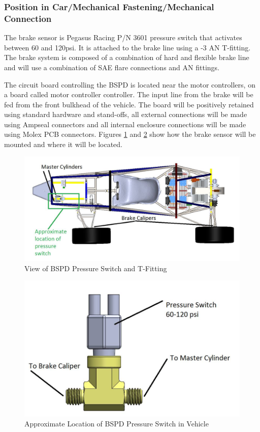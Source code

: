 \documentclass{article}
\begin{document}
        \subsubsection{Position in Car/Mechanical Fastening/Mechanical Connection}
 The brake sensor is Pegasus Racing P/N 3601 pressure switch that activates between 60 and 120psi. It is attached to the brake line using a -3 AN T-fitting. The brake system is composed of a combination of hard and flexible brake line and will use a combination of SAE flare connections and AN fittings.

            The circuit board controlling the BSPD is located near the motor controllers, on a board called motor controller controller. The input line from the brake will be fed from the front bulkhead of the vehicle. The board will be positively retained using standard hardware and stand-offs, all external connections will be made using Ampseal connectors and all internal enclosure connections will be made using Molex PCB connectors. Figures \ref{BSPDmech1} and \ref{BSPDmech2} show how the brake sensor will be mounted and where it will be located.

            \begin{figure}[H]
                \centering
                \includegraphics[width = 0.8 \textwidth]{brakeincar}
                \caption{View of BSPD Pressure Switch and T-Fitting}
                \label{BSPDmech1}
            \end{figure}

            \begin{figure}[H]
                \centering
                \includegraphics[width = 0.7 \textwidth]{brakesensor}
                \caption{Approximate Location of BSPD Pressure Switch in Vehicle}
                \label{BSPDmech2}
            \end{figure}
\end{document}
